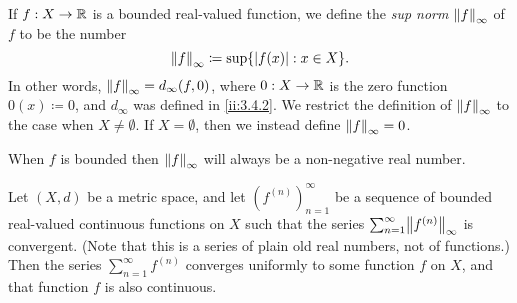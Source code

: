 \setcounter{thm}{4}
\begin{defn}\label{ii:3.5.5}
  If \(f : X \to \R\) is a bounded real-valued function, we define the \emph{sup norm} \(\norm*{f}_\infty\) of \(f\) to be the number
  \[
    \norm*{f}_\infty \coloneqq \sup\set{\abs{f(x)} : x \in X}.
  \]
  In other words, \(\norm*{f}_\infty = d_\infty(f, 0)\), where \(0 : X \to \R\) is the zero function \(0(x) \coloneqq 0\), and \(d_\infty\) was defined in \cref{ii:3.4.2}.
  We restrict the definition of \(\norm*{f}_\infty\) to the case when \(X \neq \emptyset\).
  If \(X = \emptyset\), then we instead define \(\norm*{f}_\infty = 0\).
\end{defn}

\begin{note}
  When \(f\) is bounded then \(\norm*{f}_\infty\) will always be a non-negative real number.
\end{note}

\setcounter{thm}{6}
\begin{thm}\label{ii:3.5.7}
  Let \((X, d)\) be a metric space, and let \((f^{(n)})_{n = 1}^\infty\) be a sequence of bounded real-valued continuous functions on \(X\) such that the series \(\sum_{n = 1}^\infty \norm*{f^{(n)}}_\infty\) is convergent.
  (Note that this is a series of plain old real numbers, not of functions.)
  Then the series \(\sum_{n = 1}^\infty f^{(n)}\) converges uniformly to some function \(f\) on \(X\), and that function \(f\) is also continuous.
\end{thm}

